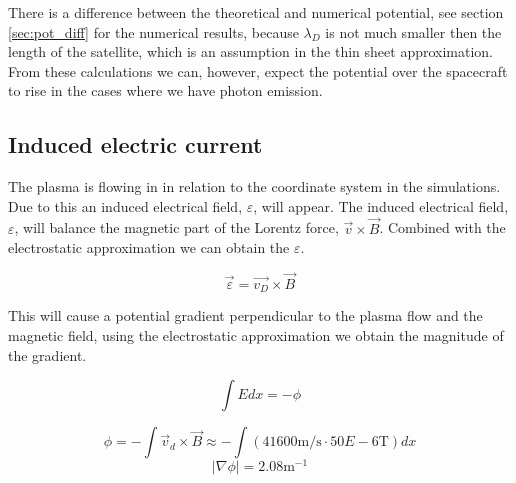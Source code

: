There is a difference between the theoretical and numerical potential, see section \ref{sec:pot_diff} for the numerical results, because $\lambda_D$ is not much
smaller then the length of the satellite, which is an assumption in the thin sheet approximation.
From these calculations we can, however, expect the potential over the spacecraft to rise
in the cases where we have photon emission.

\subsection{Induced electric current}
	The plasma is flowing in in relation to the coordinate system in the simulations.
	Due to this an induced electrical field, \(\varepsilon\), will appear.
	The induced electrical field, \(\varepsilon\), will balance the magnetic part of the Lorentz force,  \(\vec{v}\times \vec{B}\).
	Combined with the electrostatic approximation we can obtain the \(\varepsilon\).

	\begin{equation}
		\vec{\varepsilon} = \vec{v_D}\times \vec{B}
	\end{equation}

	This will cause a potential gradient perpendicular to the plasma flow and the magnetic field,
	using the electrostatic approximation we obtain the magnitude of the gradient.

	\begin{equation}
		\int{Edx} = -\phi
	\end{equation}

	\begin{equation}
		\phi = -\int \vec{v}_d\times\vec{B} \approx -\int \left( 41600 \text{m/s}\cdot 50E-6 \text{T} \right) dx
	\end{equation}
	\begin{equation}
		|\nabla\phi| = 2.08 \text{m}^{-1}
	\end{equation}

